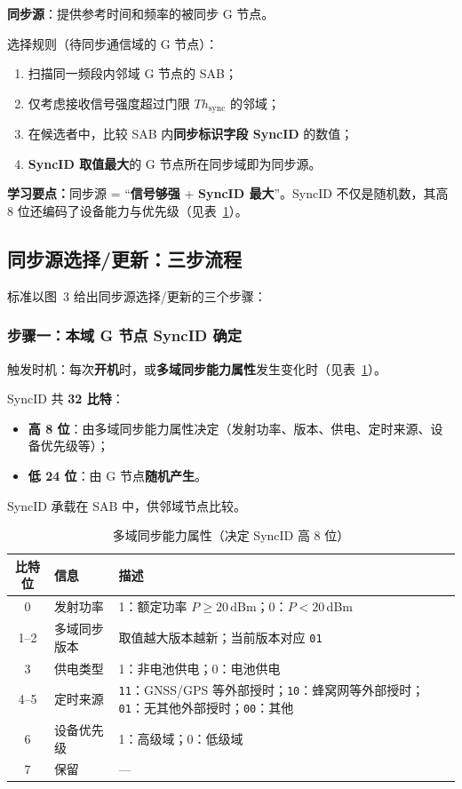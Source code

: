 \documentclass[11pt,a4paper]{ctexart}
\newcommand{\learn}[1]{\par\noindent\textcolor{blue!70!black}{\textbf{学习要点：}#1}\par}
\begin{document}
\textbf{同步源}：提供参考时间和频率的被同步 G 节点。

选择规则（待同步通信域的 G 节点）：
\begin{enumerate}
  \item 扫描同一频段内邻域 G 节点的 SAB；
  \item 仅考虑接收信号强度超过门限 $Th_{\mathrm{sync}}$ 的邻域；
  \item 在候选者中，比较 SAB 内\textbf{同步标识字段 SyncID} 的数值；
  \item \textbf{SyncID 取值最大}的 G 节点所在同步域即为同步源。
\end{enumerate}

\learn{同步源 = “\textbf{信号够强} + \textbf{SyncID 最大}”。SyncID 不仅是随机数，其高 8 位还编码了设备能力与优先级（见表~\ref{tab:sync-cap}）。}

\subsection{同步源选择/更新：三步流程}

标准以图~3 给出同步源选择/更新的三个步骤：

\subsubsection{步骤一：本域 G 节点 SyncID 确定}

触发时机：每次\textbf{开机}时，或\textbf{多域同步能力属性}发生变化时（见表~\ref{tab:sync-cap}）。

SyncID 共 \textbf{32 比特}：
\begin{itemize}
  \item \textbf{高 8 位}：由多域同步能力属性决定（发射功率、版本、供电、定时来源、设备优先级等）；
  \item \textbf{低 24 位}：由 G 节点\textbf{随机产生}。
\end{itemize}

SyncID 承载在 SAB 中，供邻域节点比较。

\begin{table}[h]
\centering
\caption{多域同步能力属性（决定 SyncID 高 8 位）}
\label{tab:sync-cap}
\begin{tabular}{clp{7.5cm}}
\toprule
\textbf{比特位} & \textbf{信息} & \textbf{描述} \\
\midrule
0 & 发射功率 & 1：额定功率 $P\ge 20$\,dBm；0：$P<20$\,dBm \\
1--2 & 多域同步版本 & 取值越大版本越新；当前版本对应 \texttt{01} \\
3 & 供电类型 & 1：非电池供电；0：电池供电 \\
4--5 & 定时来源 & \texttt{11}：GNSS/GPS 等外部授时；\texttt{10}：蜂窝网等外部授时；\texttt{01}：无其他外部授时；\texttt{00}：其他 \\
6 & 设备优先级 & 1：高级域；0：低级域 \\
7 & 保留 & — \\
\bottomrule
\end{tabular}
\end{table}
\end{document}
